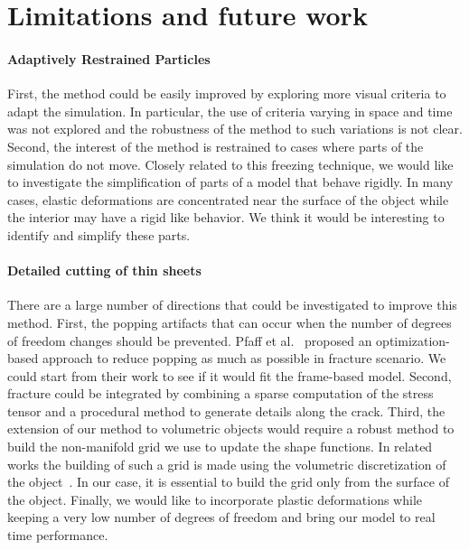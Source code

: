 \section{Limitations and future work}

\paragraph{Adaptively Restrained Particles} First, the method could be easily improved by exploring more visual criteria to adapt the simulation. 
In particular, the use of criteria varying in space and time was not explored and the robustness of the method to such variations is not clear. 
Second, the interest of the method is restrained to cases where parts of the simulation do not move. 
Closely related to this freezing technique, we would like to investigate the simplification of parts of a model that behave rigidly. 
In many cases, elastic deformations are concentrated near the surface of the object while the interior may have a rigid like behavior. 
We think it would be interesting to identify and simplify these parts.

\paragraph{Detailed cutting of thin sheets} There are a large number of directions that could be investigated to improve this method. 
First, the popping artifacts that can occur when the number of degrees of freedom changes should be prevented. 
Pfaff et al.~\cite{Pfaff2014} proposed an optimization-based approach to reduce popping as much as possible in fracture scenario.
We could start from their work to see if it would fit the frame-based model.
Second, fracture could be integrated by combining a sparse computation of the stress tensor and a procedural method to generate details along the crack. 
Third, the extension of our method to volumetric objects would require a robust method to build the non-manifold grid we use to update the shape functions. 
In related works the building of such a grid is made using the volumetric discretization of the object~\cite{Mitchell2015a,Mitchell2015b}. 
In our case, it is essential to build the grid only from the surface of the object. 
Finally, we would like to incorporate plastic deformations while keeping a very low number of degrees of freedom and bring our model to real time performance.

